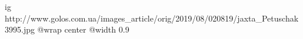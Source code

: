  
 
 
 
 

\ifcmt
  ig http://www.golos.com.ua/images_article/orig/2019/08/020819/jaxta_Petuschak3995.jpg
  @wrap center
  @width 0.9
\fi
